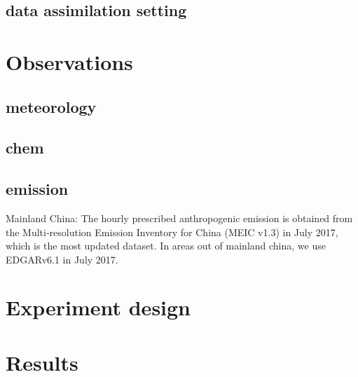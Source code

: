 \documentclass{ametsocV6.1}
\begin{document}
\subsection{data assimilation setting}

\section{Observations}

\subsection{meteorology}

\subsection{chem}

\subsection{emission}
Mainland China: The hourly prescribed anthropogenic emission is obtained from the Multi‐resolution Emission Inventory for China (MEIC v1.3) \citep{Li_2017, Zheng_2018} in July 2017, which is the most updated dataset. In areas out of mainland china, we use EDGARv6.1 in July 2017.

\section{Experiment design}

\section{Results}
\end{document}
